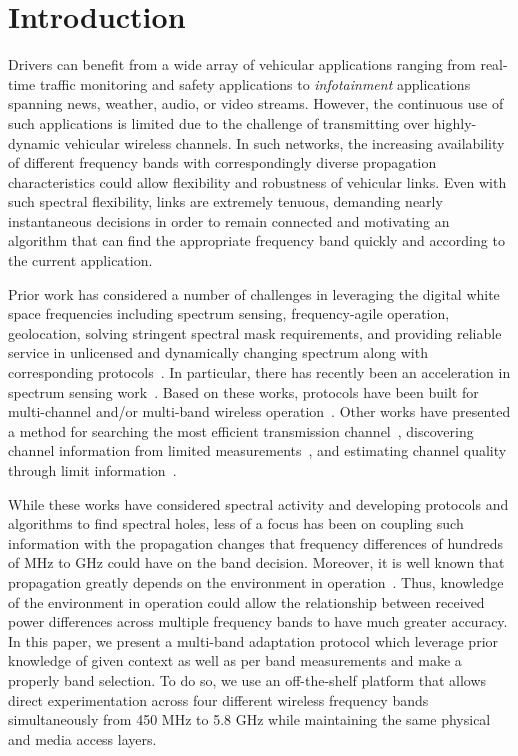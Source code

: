 
\section{Introduction}
\label{sec:introduction}


Drivers can benefit from a wide array of vehicular applications ranging from real-time traffic monitoring and
safety applications to {\it infotainment} applications spanning news, weather, audio, or video streams.  
However, the continuous use of such applications is limited due to the challenge of transmitting over 
highly-dynamic vehicular wireless channels. In such networks, the increasing availability of different 
frequency bands with correspondingly diverse propagation characteristics could allow flexibility and 
robustness of vehicular links. Even with such spectral flexibility, links are extremely tenuous, 
demanding nearly instantaneous decisions in order to remain connected and motivating an algorithm that
can find the appropriate frequency band quickly and according to the current application.

Prior work has considered a number of challenges in
leveraging the digital white space frequencies including spectrum sensing, frequency-agile operation,
geolocation, solving stringent spectral mask requirements, and providing reliable service
in unlicensed and dynamically changing spectrum along with corresponding 
protocols~\cite{shellhammer2009technical}. In particular, there has recently been an acceleration
in spectrum sensing work~\cite{rayanchu2011fluid, kim1996pulse,cabric2004implementation}. Based on 
these works, protocols have been built for multi-channel and/or multi-band wireless operation~\cite{MOAR,
raychaudhuri2003spectrum,sabharwal2007opportunistic}.  Other works have presented a method for searching the most efficient 
transmission channel~\cite{mo2005comparison}, discovering channel information from limited 
measurements~\cite{rayanchu2011fluid, sabharwal2007opportunistic}, and estimating 
channel quality through limit information~\cite{MOAR}. 

While these works have considered spectral activity and developing protocols and algorithms to 
find spectral holes, less of a focus has been on coupling such information with the propagation 
changes that frequency differences of hundreds of MHz to GHz could have on the band decision.  
Moreover, it is well known that propagation greatly depends on the environment in 
operation~\cite{rappaport}.  Thus, 
knowledge of the environment in operation could allow the relationship between received power 
differences across multiple frequency bands to have much greater accuracy.  
In this paper, 
we present a multi-band adaptation protocol which leverage 
prior knowledge of given context as well as per band
measurements and make a properly band selection.
To do so, we use an
off-the-shelf platform that allows direct experimentation across four different wireless
frequency bands simultaneously from 450 MHz to 5.8 GHz while maintaining the same physical
and media access layers.

